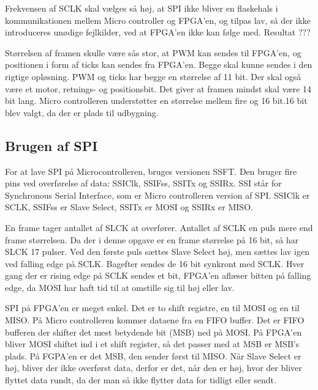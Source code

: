 Frekvensen af SCLK skal vælges så høj, at SPI ikke bliver en flaskehals i kommunikationen mellem Micro controller og FPGA’en, og tilpas lav, så der ikke introduceres unødige fejlkilder, ved at FPGA’en ikke kan følge med. Resultat ???


Størrelsen af framen skulle være sås stor, at PWM kan sendes til FPGA’en, og positionen i form af ticks kan sendes fra FPGA’en. Begge skal kunne sendes i den rigtige opløsning. PWM og ticks har begge en størrelse af 11 bit. Der skal også være et motor, retnings- og positionsbit. Det giver at framen mindst skal være 14 bit lang. Micro controlleren understøtter en størrelse mellem fire og 16 bit.16 bit blev valgt, da der er plads til udbygning.



\subsection{Brugen af SPI}

For at lave SPI på Microcontrolleren, bruges versionen SSFT. Den bruger fire pins ved overførelse af data: SSIClk, SSIFss, SSITx og SSIRx. SSI står for Synchronous Serial Interface, som er Micro controlleren version af SPI. SSIClk er SCLK, SSIFss er Slave Select, SSITx er MOSI og SSIRx er MISO.


En frame tager antallet af SLCK at overfører. Antallet af SCLK en puls mere end frame størrelsen. Da der i denne opgave er en frame størrelse på 16 bit, så har SLCK 17 pulser. Ved den første puls sættes Slave Select høj, men sættes lav igen ved falling edge på SCLK. Bagefter sendes de 16 bit synkront med SCLK. Hver gang der er rising edge på SCLK sendes et bit, FPGA’en aflæser bitten på falling edge, da MOSI har haft tid til at omstille sig til høj eller lav.

SPI på FPGA’en er meget enkel. Det er to shift registre, en til MOSI og en til MISO. På Micro controlleren kommer dataene fra en FIFO buffer. Det er FIFO bufferen der shifter det mest betydende bit (MSB) ned på MOSI. På FPGA’en bliver MOSI shiftet ind i et shift register, så det passer med at MSB er MSB’s plads. På FGPA’en er det MSB, den sender først til MISO. Når Slave Select er høj, bliver der ikke overførst data, derfor er det, når den er høj, hvor der bliver flyttet data rundt, da der man så ikke flytter data for tidligt eller sendt. 

